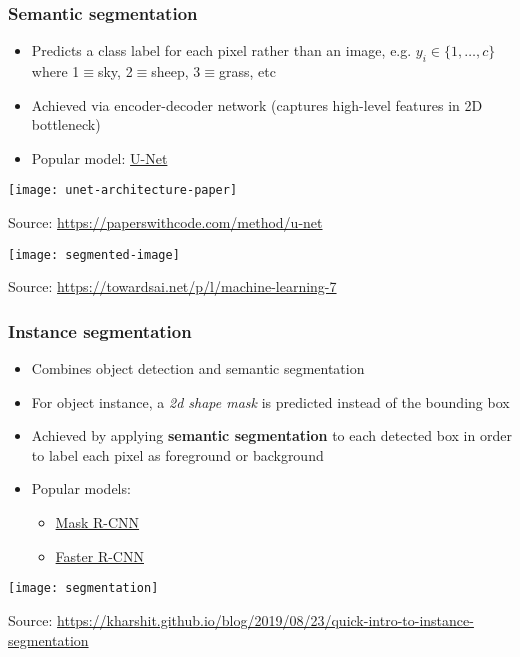 \documentclass[smaller]{beamer}
\begin{document}
\begin{frame}
  \frametitle{Semantic segmentation}
  \pe
  \begin{itemize}
  \item Predicts a class label for each pixel rather than an image, e.g. $y_i \in \{1,\ldots,c\}$ where 1$\equiv$sky, 2$\equiv$sheep, 3$\equiv$grass, etc \pe
  \item Achieved via encoder-decoder network (captures high-level features in 2D bottleneck)\pe
  \item Popular model: \href{https://link.springer.com/chapter/10.1007/978-3-319-24574-4_28}{U-Net}\pe
  \end{itemize}

      
    \begin{minipage}[h]{.6\linewidth}
    \texttt{[image: unet-architecture-paper]}

    {\tiny Source: \url{https://paperswithcode.com/method/u-net}}      
    \end{minipage}
    \begin{minipage}[h]{.36\linewidth}
      \texttt{[image: segmented-image]}
      \raggedright
    {\tiny Source: \url{https://towardsai.net/p/l/machine-learning-7}}
    \end{minipage}
 

  
\end{frame}


\begin{frame}
  \frametitle{Instance segmentation}
  \pe

  \begin{itemize}
  \item Combines object detection and semantic segmentation\pe
    \item For object instance, a \textit{2d shape mask} is predicted instead of the bounding box\pe
  \item Achieved by applying \textbf{semantic segmentation} to each detected box in order to label each pixel
    as foreground or background\pe
  \item Popular models: \pe
    \begin{itemize}
    \item \href{https://arxiv.org/pdf/1703.06870.pdf}{Mask R-CNN}\pe
    \item \href{https://arxiv.org/pdf/1506.01497.pdf}{Faster R-CNN}
    \end{itemize}
  \end{itemize}
  \pe

    
  \begin{center}
    \texttt{[image: segmentation]}

    {\tiny Source: \url{https://kharshit.github.io/blog/2019/08/23/quick-intro-to-instance-segmentation}}
  \end{center}

\end{frame}
\end{document}

